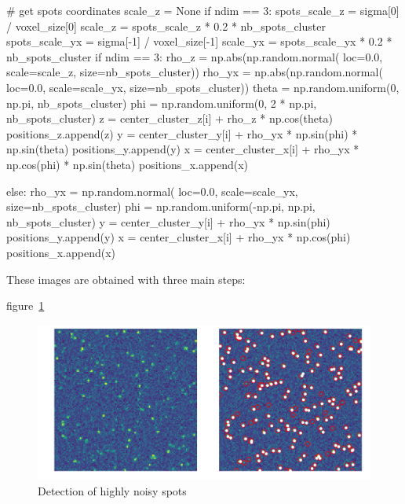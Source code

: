 # get spots coordinates
scale_z = None
if ndim == 3:
	spots_scale_z = sigma[0] / voxel_size[0]
	scale_z = spots_scale_z * 0.2 * nb_spots_cluster
spots_scale_yx = sigma[-1] / voxel_size[-1]
scale_yx = spots_scale_yx * 0.2 * nb_spots_cluster
if ndim == 3:
	rho_z = np.abs(np.random.normal(
		loc=0.0, scale=scale_z, size=nb_spots_cluster))
	rho_yx = np.abs(np.random.normal(
		loc=0.0, scale=scale_yx, size=nb_spots_cluster))
	theta = np.random.uniform(0, np.pi, nb_spots_cluster)
	phi = np.random.uniform(0, 2 * np.pi, nb_spots_cluster)
	z = center_cluster_z[i] + rho_z * np.cos(theta)
	positions_z.append(z)
	y = center_cluster_y[i] + rho_yx * np.sin(phi) * np.sin(theta)
	positions_y.append(y)
	x = center_cluster_x[i] + rho_yx * np.cos(phi) * np.sin(theta)
	positions_x.append(x)

else:
	rho_yx = np.random.normal(
		loc=0.0, scale=scale_yx, size=nb_spots_cluster)
	phi = np.random.uniform(-np.pi, np.pi, nb_spots_cluster)
	y = center_cluster_y[i] + rho_yx * np.sin(phi)
	positions_y.append(y)
	x = center_cluster_x[i] + rho_yx * np.cos(phi)
	positions_x.append(x)





These images are obtained with three main steps:




figure~\ref{fig:spot_detection_high_noise}

\begin{figure}[h]
    \centering
    \includegraphics[width=1\textwidth]{figures/chapter2/plot_spot_detection}
    \caption{Detection of highly noisy spots}
    \label{fig:spot_detection_high_noise}
\end{figure}




